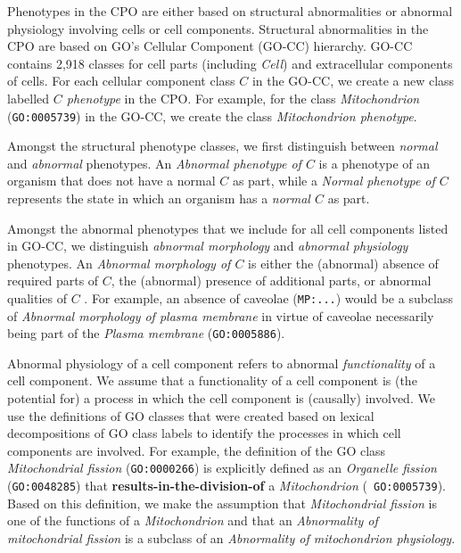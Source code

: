 \documentclass{bioinfo}
\renewcommand{\cite}{\citep}
\begin{document}
Phenotypes in the CPO are either based on structural abnormalities or
abnormal physiology involving cells or cell components. Structural
abnormalities in the CPO are based on GO's Cellular Component (GO-CC)
hierarchy. GO-CC contains 2,918 classes for cell parts (including {\em
  Cell}) and extracellular components of cells. For each cellular
component class $C$ in the GO-CC, we create a new class labelled {\em
  $C$ phenotype} in the CPO. For example, for the class {\em
  Mitochondrion} ({\tt GO:0005739}) in the GO-CC, we create the class
{\em Mitochondrion phenotype}.

Amongst the structural phenotype classes, we first distinguish between
{\em normal} and {\em abnormal} phenotypes. An {\em Abnormal phenotype
  of $C$} is a phenotype of an organism that does not have a normal
$C$ as part, while a {\em Normal phenotype of $C$} represents the
state in which an organism has a {\em normal $C$} as part.

Amongst the abnormal phenotypes that we include for all cell
components listed in GO-CC, we distinguish {\em abnormal morphology}
and {\em abnormal physiology} phenotypes. An {\em Abnormal morphology
  of $C$} is either the (abnormal) absence of required parts of $C$,
the (abnormal) presence of additional parts, or abnormal qualities of
$C$ \cite{Hoehndorf2010phene}. For example, an absence of caveolae
({\tt MP:...}) would be a subclass of {\em Abnormal morphology of
  plasma membrane} in virtue of caveolae necessarily being part of the
{\em Plasma membrane} ({\tt GO:0005886}).

Abnormal physiology of a cell component refers to abnormal {\em
  functionality} of a cell component. We assume that a functionality
of a cell component is (the potential for) a process in which the cell
component is (causally) involved. We use the definitions of GO classes
that were created based on lexical decompositions of GO class labels
\cite{Mungall2010go, Bada2007a, Ogren2004} to identify the processes
in which cell components are involved. For example, the definition of
the GO class {\em Mitochondrial fission} ({\tt GO:0000266}) is
explicitly defined as an {\em Organelle fission} ({\tt GO:0048285})
that {\bf results-in-the-division-of} a {\em Mitochondrion} ({\tt
  GO:0005739}). Based on this definition, we make the assumption that
{\em Mitochondrial fission} is one of the functions of a {\em
  Mitochondrion} and that an {\em Abnormality of mitochondrial
  fission} is a subclass of an {\em Abnormality of mitochondrion
  physiology}.
\end{document}
